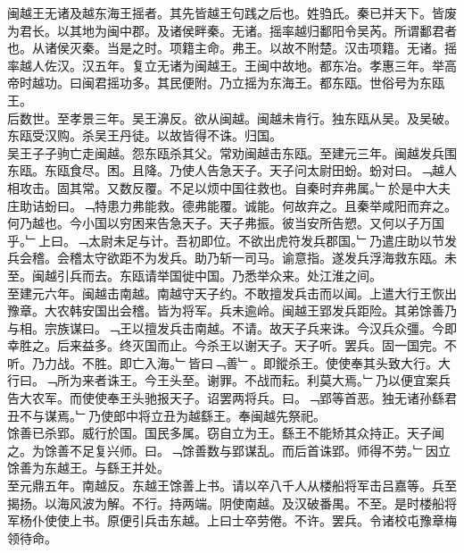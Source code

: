 \documentclass{zhvt-classic}
\begin{document}

\hspace*{2em}闽越王无诸及越东海王摇者。其先皆越王句践之后也。姓驺氏。秦已并天下。皆废为君长。以其地为闽中郡。及诸侯畔秦。无诸。摇率越归鄱阳令吴芮。所谓鄱君者也。从诸侯灭秦。当是之时。项籍主命。弗王。以故不附楚。汉击项籍。无诸。摇率越人佐汉。汉五年。复立无诸为闽越王。王闽中故地。都东冶。孝惠三年。举高帝时越功。曰闽君摇功多。其民便附。乃立摇为东海王。都东瓯。世俗号为东瓯王。\\
\hspace*{2em}后数世。至孝景三年。吴王濞反。欲从闽越。闽越未肯行。独东瓯从吴。及吴破。东瓯受汉购。杀吴王丹徒。以故皆得不诛。归国。\\
\hspace*{2em}吴王子子驹亡走闽越。怨东瓯杀其父。常劝闽越击东瓯。至建元三年。闽越发兵围东瓯。东瓯食尽。困。且降。乃使人告急天子。天子问太尉田蚡。蚡对曰。﹁越人相攻击。固其常。又数反覆。不足以烦中国往救也。自秦时弃弗属。﹂於是中大夫庄助诘蚡曰。﹁特患力弗能救。德弗能覆。诚能。何故弃之。且秦举咸阳而弃之。何乃越也。今小国以穷困来告急天子。天子弗振。彼当安所告愬。又何以子万国乎。﹂上曰。﹁太尉未足与计。吾初即位。不欲出虎符发兵郡国。﹂乃遣庄助以节发兵会稽。会稽太守欲距不为发兵。助乃斩一司马。谕意指。遂发兵浮海救东瓯。未至。闽越引兵而去。东瓯请举国徙中国。乃悉举众来。处江淮之间。\\
\hspace*{2em}至建元六年。闽越击南越。南越守天子约。不敢擅发兵击而以闻。上遣大行王恢出豫章。大农韩安国出会稽。皆为将军。兵未逾岭。闽越王郢发兵距险。其弟馀善乃与相。宗族谋曰。﹁王以擅发兵击南越。不请。故天子兵来诛。今汉兵众彊。今即幸胜之。后来益多。终灭国而止。今杀王以谢天子。天子听。罢兵。固一国完。不听。乃力战。不胜。即亡入海。﹂皆曰﹁善﹂。即鏦杀王。使使奉其头致大行。大行曰。﹁所为来者诛王。今王头至。谢罪。不战而耘。利莫大焉。﹂乃以便宜案兵告大农军。而使使奉王头驰报天子。诏罢两将兵。曰。﹁郢等首恶。独无诸孙繇君丑不与谋焉。﹂乃使郎中将立丑为越繇王。奉闽越先祭祀。\\
\hspace*{2em}馀善已杀郢。威行於国。国民多属。窃自立为王。繇王不能矫其众持正。天子闻之。为馀善不足复兴师。曰。﹁馀善数与郢谋乱。而后首诛郢。师得不劳。﹂因立馀善为东越王。与繇王并处。\\
\hspace*{2em}至元鼎五年。南越反。东越王馀善上书。请以卒八千人从楼船将军击吕嘉等。兵至揭扬。以海风波为解。不行。持两端。阴使南越。及汉破番禺。不至。是时楼船将军杨仆使使上书。原便引兵击东越。上曰士卒劳倦。不许。罢兵。令诸校屯豫章梅领待命。\\
\end{document}
